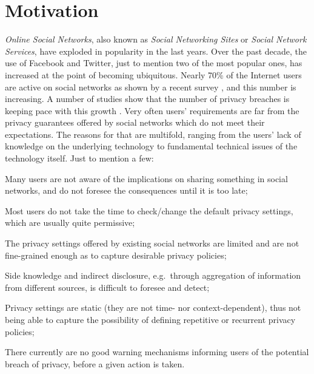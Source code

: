 \section{Motivation}

{\em Online Social Networks}, also known as {\em Social Networking Sites} or {\em Social Network Services}, have exploded in popularity in the last years.
Over the past decade, the use of Facebook and Twitter, just to mention two of the most popular ones, has increased at the point of becoming ubiquitous.
Nearly 70\% of the Internet users are active on social networks as shown by a recent survey \cite{SNSuse}, and this number is increasing.
A number of studies show that the number of privacy breaches is keeping pace with this growth \cite{MJB12spse+,JEM12fpc,YKBA11afps+,MJB11fosn+}.
Very often users' requirements are far from the privacy guarantees offered by social networks  which do not meet their expectations. The reasons for that are multifold, ranging from the users' lack of knowledge on the underlying technology to fundamental technical issues of the technology itself. Just to mention a few:
\begin{inparaenum}[i)]
\item Many users are not aware of the implications on sharing something in social networks, and do not foresee the consequences until it is too late;
\item Most users do not take the time to check/change the default privacy settings, which are usually quite permissive;
\item The privacy settings offered by existing social networks are limited and are not fine-grained enough as to capture desirable privacy policies;
\item Side knowledge and indirect disclosure, e.g.~through aggregation of information from different sources, is difficult to foresee and detect;
\item Privacy settings are static (they are not time- nor context-dependent), thus not being able to capture the possibility of defining repetitive or recurrent privacy policies;
\item There currently are no good warning mechanisms informing users of the potential breach of privacy, before a given action is taken.
\end{inparaenum}

